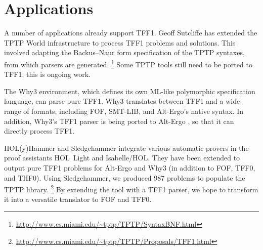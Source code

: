 \section{Applications}
\label{sec_apps}

A number of applications already support TFF1. Geoff
Sutcliffe has extended the TPTP World infrastructure to process TFF1 problems
and solutions. This involved adapting the Backus--Naur form specification of the
TPTP syntaxes, from which parsers are generated.%
\footnote{\url{http://www.cs.miami.edu/~tptp/TPTP/SyntaxBNF.html}}
Some TPTP tools still need to be ported to TFF1; this is ongoing work.

The Why3 \cite{bobot-et-al-2011} environment, which defines its own ML-like
polymorphic specification language, can parse pure TFF1. Why3 translates
between TFF1 and a wide range of
formats, including FOF, SMT-LIB, and
Alt-Ergo's native syntax.
In addition, Why3's TFF1 parser is being ported to
Alt-Ergo \cite{bobot-et-al-2008}, so that it can directly process TFF1. %

HOL(y)Hammer \cite{kaliszyk-urban-2013}
and Sledgehammer \cite{paulson-blanchette-2010}
integrate various automatic provers
in the proof assistants HOL~Light and Isabelle\slash HOL. They have been
extended to output pure TFF1 problems for Alt-Ergo and Why3
(in addition to FOF, TFF0, and THF0).
Using Sledgehammer, we produced 987 problems to populate the TPTP
library.%
\footnote{\url{http://www.cs.miami.edu/~tptp/TPTP/Proposals/TFF1.html}}
By extending the tool with a TFF1 parser,
we hope to transform it into a versatile translator to FOF and
TFF0.



